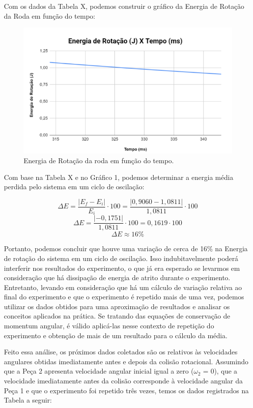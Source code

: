 Com os dados da Tabela X, podemos construir o gráfico da Energia de Rotação da Roda em função do tempo:

\begin{figure}[H]
  \centering
  \includegraphics[scale=0.8]{images/energia_de_rotação_x_tempo.png}
  \caption{Energia de Rotação da roda em função do tempo.}
\end{figure}

Com base na Tabela X e no Gráfico 1, podemos determinar a energia média perdida pelo sistema em um ciclo de oscilação:

\[\Delta E = \frac {|E_f - E_i|}{E_i}\cdot 100 = \frac {|0,9060 - 1,0811|}{1,0811} \cdot 100 \]
\[\Delta E = \frac {|-0,1751|}{1,0811}\cdot 100 = 0,1619\cdot 100 \]
\[\Delta E \approx 16\% \]

Portanto, podemos concluir que houve uma variação de cerca de 16\% na Energia de rotação do sistema em um ciclo de oscilação. Isso indubitavelmente poderá interferir nos resultados do experimento, o que já era esperado se levarmos em consideração que há dissipação de energia de atrito durante o experimento. Entretanto, levando em consideração que há um cálculo de variação relativa ao final do experimento e que o experimento é repetido mais de uma vez, podemos utilizar os dados obtidos para uma aproximação de resultados e analisar os conceitos aplicados na prática. Se tratando das equações de conservação de momentum angular, é válido aplicá-las nesse contexto de repetição do experimento e obtenção de mais de um resultado para o cálculo da média.

Feito essa análise, os próximos dados coletados são os relativos às velocidades angulares obtidas imediatamente antes e depois da colisão rotacional. Assumindo que a Peça 2 apresenta velocidade angular inicial igual a zero ($\omega_2$ = 0), que a velocidade imediatamente antes da colisão corresponde à velocidade angular da Peça 1 e que o experimento foi repetido três vezes, temos os dados registrados na Tabela a seguir:

